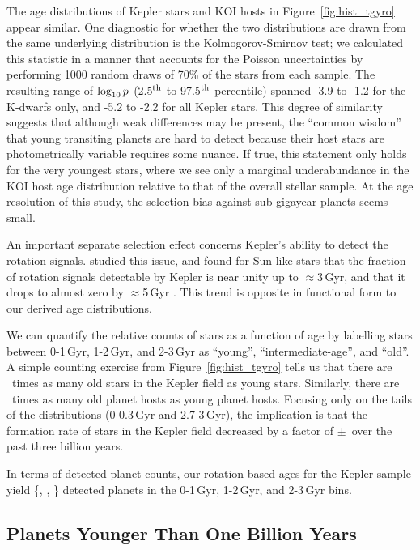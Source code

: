 \documentclass[11pt,twocolumn,tighten]{aastex63}
\begin{document}
The age distributions of Kepler stars and KOI hosts in Figure~\ref{fig:hist_tgyro} appear
similar.  One diagnostic for whether the two
distributions are drawn from the same underlying distribution is the
Kolmogorov-Smirnov test;  we calculated this statistic in a manner
that accounts for the Poisson uncertainties by performing 1000 random
draws of 70\% of the stars from each sample.  The resulting 
range of $\log_{\rm 10}p$ (2.5$^{\rm th}$ to 97.5$^{\rm th}$ percentile)
spanned -3.9 to -1.2 for the K-dwarfs only,
and -5.2 to -2.2 for all Kepler stars.  This degree of similarity suggests 
that although weak differences may be present,
the ``common wisdom'' that young transiting planets are hard to detect
because their host stars are photometrically variable requires some
nuance.  If true, this statement only holds for the very youngest
stars, where we see only a marginal underabundance in the KOI host age
distribution relative to that of the overall stellar sample.
At the age resolution of this study, 
the selection bias against sub-gigayear planets seems small. 

An important separate selection effect concerns Kepler's ability to
detect the rotation signals.  \citet{2022ApJ...937...94M} studied this
issue, and found for Sun-like stars that the fraction of rotation
signals detectable by Kepler is near unity up to $\approx$3\,Gyr, and
that it drops to almost zero by $\approx$5\,Gyr .  This trend is
opposite in functional form to our derived age distributions.

We can quantify the relative counts of stars as a function of age by
labelling stars between 0-1\,Gyr, 1-2\,Gyr, and 2-3\,Gyr as ``young'',
``intermediate-age'', and ``old''.  A simple counting exercise from
Figure~\ref{fig:hist_tgyro} tells us that there are \ratioobtoybstars\
times as many old stars in the Kepler field as young stars.
Similarly, there are \ratioobtoybplanets\ times as many old planet
hosts as young planet hosts.  Focusing only on the tails of the
distributions (0-0.3\,Gyr and 2.7-3\,Gyr), the implication is that the
formation rate of stars in the Kepler field decreased by a factor of
\ratiosfr$\pm$\uncratiosfr\ over the past three billion years.

In terms of detected planet counts, our rotation-based ages for the
Kepler sample yield \{\nplyounggyro, \nplmidgyro, \nploldgyro\}
detected planets in the 0-1\,Gyr, 1-2\,Gyr, and 2-3\,Gyr bins.  


\subsection{Planets Younger Than One Billion Years}
\end{document}
